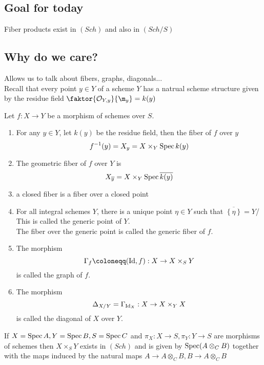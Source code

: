 \documentclass[../main.tex]{subfiles}
\begin{document}
\subsection*{Goal for today}
\begin{thm}
	Fiber products exist in $( Sch) $ and also in  $( Sch/S) $ 
\end{thm}
\subsection*{Why do we care?}
Allows us to talk about fibers, graphs, diagonals...\\
Recall that every point $y \in Y$ of a scheme $Y$ has a natrual scheme structure given by the residue field $ \faktor{\O_{Y,y} }{\m_y}= k( y) $ 
\begin{defn}[Fibers]
	Let $f:X\to Y$ be a morphism of schemes over $S$.\\
	\begin{enumerate}
	\item For any $y \in Y$, let $k( y) $ be the residue field, then the fiber of $f$ over $y$ 
		\[ 
		f^{-1}( y) = X_y = X\times_Y \operatorname{Spec} k( y) 
		\]
	
	\item The geometric fiber of $f$ over $Y$ is
		\[ 
		X_{ \overline{y}} = X\times_Y \operatorname{Spec} \overline{k( y) } 
		\]

	\item a closed fiber is a fiber over a closed point
	\item For all integral schemes $Y$, there is a unique point $\eta\in Y$ such that $ \overline{ \left\{ \eta \right\} }= Y$/\\
		This is called the generic point of $Y$.\\
		The fiber over the generic point is called the generic fiber of $f$.
	\item The morphism 
		\[ 
		\Gamma_f \coloneqq ( \id,f) : X\to X\times_S Y
		\]
		is called the graph of $f$.
	\item The morphism
		\[ 
		\Delta_{X /Y} = \Gamma_{\operatorname{Id}_X} : X\to X\times_Y X
		\]
		is called the diagonal of $X$ over $Y$.
	\end{enumerate}
\end{defn}
\begin{propo}
If $X= \operatorname{Spec} A, Y = \operatorname{Spec} B, S= \operatorname{Spec} C$ and $\pi_X: X\to S,\pi_Y:Y\to S$ are morphisms of schemes then $X\times_S Y$ exists in $( Sch) $ and is given by $\operatorname{Spec} ( A\otimes_C B) $ together with the maps induced by the natural maps $A \to A\otimes_C B, B \to A\otimes_C B$ 
\end{propo}
\end{document}
